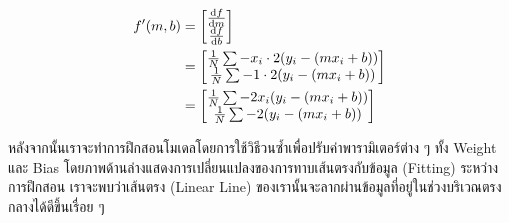 \begin{align}\label{eq:grad_simple_reg}
    f'(m,b) & =
    \begin{bmatrix}
        \dv{f}{m} \\
        \dv{f}{b} \\
    \end{bmatrix}                                  \\
            & =
    \begin{bmatrix}
        \frac{1}{N} \sum -x_i \cdot 2(y_i - (mx_i + b)) \\
        \frac{1}{N} \sum -1 \cdot 2(y_i - (mx_i + b))   \\
    \end{bmatrix} \\
            & =
    \begin{bmatrix}
        \frac{1}{N} \sum -2x_i(y_i - (mx_i + b)) \\
        \frac{1}{N} \sum -2(y_i - (mx_i + b))    \\
    \end{bmatrix}
\end{align}

หลังจากนั้นเราจะทำการฝึกสอนโมเดลโดยการใช้วิธีวนซ้ำเพื่อปรับค่าพารามิเตอร์ต่าง ๆ ทั้ง Weight และ Bias โดยภาพด้านล่างแสดงการเปลี่ยนแปลงของการทาบเส้นตรงกับข้อมูล (Fitting) ระหว่างการฝึกสอน เราจะพบว่าเส้นตรง (Linear Line) ของเรานั้นจะลากผ่านข้อมูลที่อยู่ในช่วงบริเวณตรงกลางได้ดีขึ้นเรื่อย ๆ

